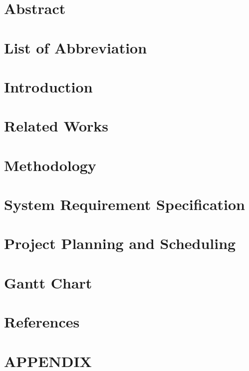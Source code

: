 \documentclass[12pt,a4paper]{report}
\begin{document}



\chapter*{Abstract}
\label{abstract}


\tableofcontents
\thispagestyle{empty}
\addtocounter{page}{-1}
\newpage

\listoffigures
{}
\newpage

\listoftables
{}
\newpage

\chapter*{List of Abbreviation}
\label{abbreviation}

\newpage


\chapter{Introduction}
\label{introduction}


\chapter{Related Works}
\label{literaturereview}


\chapter{Methodology}
\label{relatedtheory}


\chapter{System Requirement Specification}
\label{feasiblity}


\chapter{Project Planning and Scheduling}
\label{methodology}



\chapter*{Gantt Chart}
\label{ganttchart}


\chapter*{References}
\label{references}

\chapter*{APPENDIX}
\label{appendix}

\end{document}
